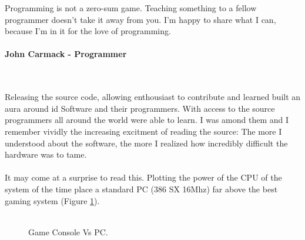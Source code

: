  \begin{fancyquotes}
   Programming is not a zero-sum game. Teaching something to a fellow programmer doesn't take it away from you. I'm happy to share what I can, because I'm in it for the love of programming.\\
   \\
\textbf{John Carmack - Programmer}
 \end{fancyquotes}
\\
\\
Releasing the source code, allowing enthousiast to contribute and learned built an aura around id Software and their programmers. With access to the source programmers all around the world were able to learn. I was amond them and I remember vividly the increasing excitment of reading the source: The more I understood about the software, the more I realized how incredibly difficult the hardware was to tame.\\
\\
It may come at a surprise to read this. Plotting the power of the CPU of the system of the time place a standard PC (386 SX 16Mhz) far above the best gaming system (Figure \ref{fig:game_console_vs_PC}).\\
\\
\begin{figure}[H]
\centering
   \caption{Game Console Vs PC.} \label{fig:game_console_vs_PC}
 \end{figure}

